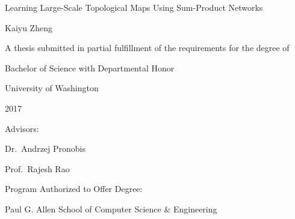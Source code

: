 \documentclass[10pt, titlepage]{article}
\author{Kaiyu Zheng}
\date{April 2017}
\theoremstyle{definition}
\begin{document}
\begin{titlepage}
\centering
{}
\vspace*{\fill}
  \huge Learning Large-Scale Topological Maps Using Sum-Product Networks\normalsize

  \vspace{0.5in}

  \Large Kaiyu Zheng\large

  \vspace{1.2in}

  A thesis submitted in partial fulfillment of the requirements for the degree of

  \vspace{0.1in}

  Bachelor of Science with Departmental Honor

  \vspace{0.8in}
  University of Washington

  2017

  \vspace{0.4in}
  Advisors:

  Dr.~Andrzej Pronobis

  Prof.~Rajesh Rao

  \vspace{0.8in}
  Program Authorized to Offer Degree:

  \vspace{0.1in}

  Paul G. Allen School of Computer Science \& Engineering\normalsize
\vspace*{\fill}

\end{titlepage}


\newpage
\end{document}
